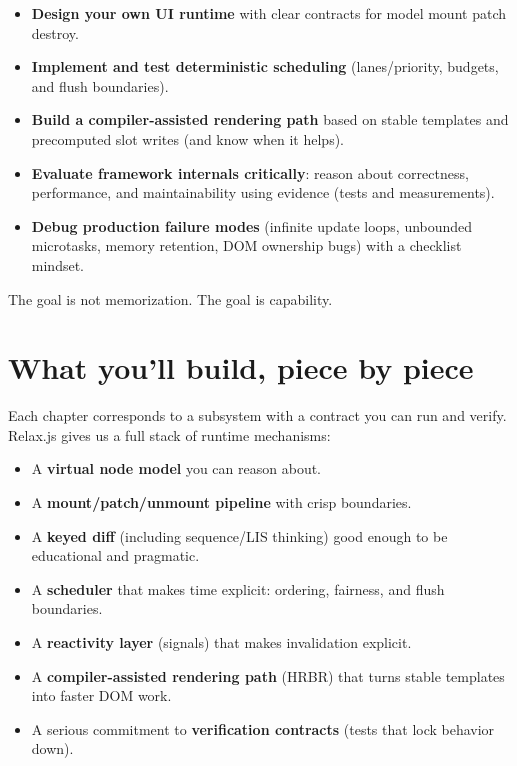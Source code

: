 \begin{itemize}
  \item \textbf{Design your own UI runtime} with clear contracts for model \textrightarrow mount \textrightarrow patch \textrightarrow destroy.
  \item \textbf{Implement and test deterministic scheduling} (lanes/priority, budgets, and flush boundaries).
  \item \textbf{Build a compiler-assisted rendering path} based on stable templates and precomputed slot writes (and know when it helps).
  \item \textbf{Evaluate framework internals critically}: reason about correctness, performance, and maintainability using evidence (tests and measurements).
  \item \textbf{Debug production failure modes} (infinite update loops, unbounded microtasks, memory retention, DOM ownership bugs) with a checklist mindset.
\end{itemize}

The goal is not memorization.
The goal is capability.

\section*{What you'll build, piece by piece}

Each chapter corresponds to a subsystem with a contract you can run and verify.
Relax.js gives us a full stack of runtime mechanisms:

\begin{itemize}
  \item A \textbf{virtual node model} you can reason about.
  \item A \textbf{mount/patch/unmount pipeline} with crisp boundaries.
  \item A \textbf{keyed diff} (including sequence/LIS thinking) good enough to be educational and pragmatic.
  \item A \textbf{scheduler} that makes time explicit: ordering, fairness, and flush boundaries.
  \item A \textbf{reactivity layer} (signals) that makes invalidation explicit.
  \item A \textbf{compiler-assisted rendering path} (HRBR) that turns stable templates into faster DOM work.
  \item A serious commitment to \textbf{verification contracts} (tests that lock behavior down).
\end{itemize}

